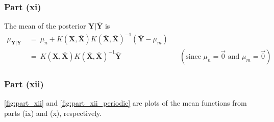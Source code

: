 \documentclass[twoside,11pt]{homework}
\DeclarePairedDelimiter{\2norm}{\lVert}{\rVert^2_2}
\newcommand{\1}[1]{\mathds{1}\left[#1\right]}
\begin{document}
\subsubsection*{Part (xi)}

The mean of the posterior $\textbf{Y}\vert\overline{\textbf{Y}}$ is 
\begin{align*}
\mu_{\textbf{Y}\vert\overline{\textbf{Y}}} \ & = \  \mu_n  +  K(\textbf{X}, \overline{\textbf{X}})K(\overline{\textbf{X}} , \overline{\textbf{X}})^{-1}\left(\overline{\textbf{Y}} - \mu_m\right) \\[1em]
& = \ K(\textbf{X}, \overline{\textbf{X}})K(\overline{\textbf{X}} , \overline{\textbf{X}})^{-1}\overline{\textbf{Y}} && \left(\text{since } \mu_n = \vec{0} \text{ and } \mu_m = \vec{0}\right)
\end{align*}



\vspace{0.15in}

\subsubsection*{Part (xii)}
\autoref{fig:part_xii} and \autoref{fig:part_xii_periodic} are plots of the mean functions from parts (ix) and (x), respectively.
\end{document}
